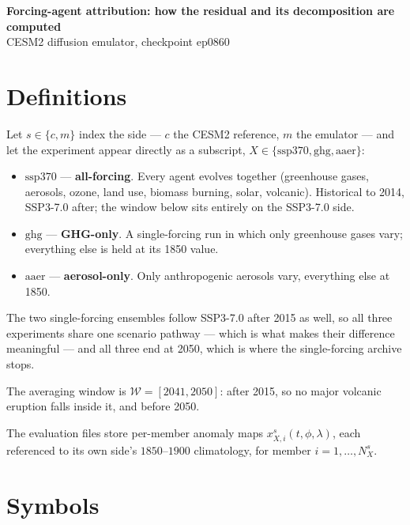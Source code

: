 \documentclass[11pt]{article}
\newcommand{\Xssp}{\mathrm{ssp370}}
\newcommand{\Xghg}{\mathrm{ghg}}
\newcommand{\Xaer}{\mathrm{aaer}}
\begin{document}
\begin{center}
{\large\bfseries Forcing-agent attribution: how the residual and its
decomposition are computed}\\[2pt]
CESM2 diffusion emulator, checkpoint ep0860
\end{center}

\section*{Definitions}

Let $s\in\{c,m\}$ index the side --- $c$ the CESM2 reference, $m$ the
emulator --- and let the experiment appear directly as a subscript,
$X\in\{\Xssp,\Xghg,\Xaer\}$:

\begin{itemize}\setlength{\itemsep}{2pt}
\item $\Xssp$ --- \textbf{all-forcing}. Every agent evolves together
  (greenhouse gases, aerosols, ozone, land use, biomass burning, solar,
  volcanic). Historical to 2014, SSP3-7.0 after; the window below sits
  entirely on the SSP3-7.0 side.
\item $\Xghg$ --- \textbf{GHG-only}. A single-forcing run in which only
  greenhouse gases vary; everything else is held at its 1850 value.
\item $\Xaer$ --- \textbf{aerosol-only}. Only anthropogenic aerosols
  vary, everything else at 1850.
\end{itemize}

The two single-forcing ensembles follow SSP3-7.0 after 2015 as well, so
all three experiments share one scenario pathway --- which is what makes
their difference meaningful --- and all three end at 2050, which is where
the single-forcing archive stops.

The averaging window is $\mathcal{W}=[2041,2050]$: after 2015, so no
major volcanic eruption falls inside it, and before 2050.

The evaluation files store per-member anomaly maps
$x^{s}_{X,i}(t,\phi,\lambda)$, each referenced to its own side's
$1850$--$1900$ climatology, for member $i=1,\dots,N^{s}_{X}$.

\section*{Symbols}
\end{document}
